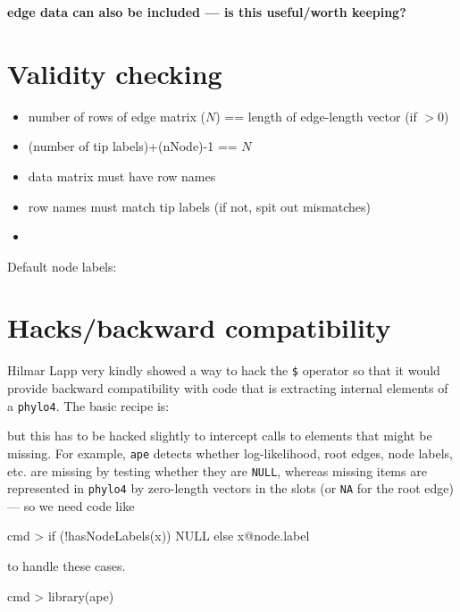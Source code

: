 \documentclass{article}
\newcommand{\code}[1]{{{\tt #1}}}
\begin{document}
\textbf{edge data can also be included --- is this
useful/worth keeping?}

\section{Validity checking}

\begin{itemize}
\item number of rows of edge matrix ($N$) == length of edge-length vector (if $>0$)
\item (number of tip labels)+(nNode)-1 == $N$
\item data matrix must have row names
\item row names must match tip labels (if not, spit out mismatches)
\item 
\end{itemize}
 
Default node labels:

\section{Hacks/backward compatibility}

Hilmar Lapp very kindly showed a way to hack
the \verb+$+ operator so that it would provide
backward compatibility with code that is 
extracting internal elements of a \code{phylo4}.
The basic recipe is:
\begin{Schunk}
\end{Schunk}
but this has to be hacked slightly to intercept
calls to elements that might be missing.  For example,
\code{ape} detects whether log-likelihood, root edges,
node labels, etc. are missing by testing whether they
are \code{NULL}, whereas missing items are represented
in \code{phylo4} by zero-length vectors in the slots 
(or \code{NA} for the root edge) --- so we need code
like
\begin{Schunk}
\begin{Sinput}
cmd > if (!hasNodeLabels(x)) NULL else x@node.label
\end{Sinput}
\end{Schunk}
to handle these cases.

\begin{Schunk}
\begin{Sinput}
cmd > library(ape)
\end{Sinput}
\end{Schunk}
\end{document}
